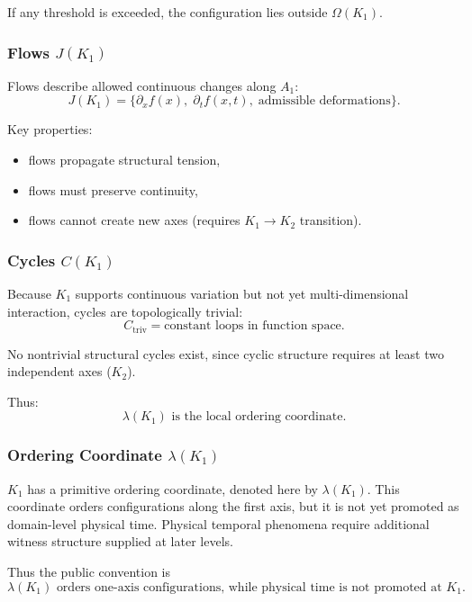 If any threshold is exceeded, the configuration lies outside
$\Omega(K_1)$.

\subsubsection{Flows \texorpdfstring{$J(K_1)$}{J(K_1)}}

Flows describe allowed continuous changes along $A_1$:
\[
J(K_1) = \{ \partial_x f(x),\; \partial_t f(x,t),\; \text{admissible deformations} \}.
\]

Key properties:
\begin{itemize}
    \item flows propagate structural tension,
    \item flows must preserve continuity,
    \item flows cannot create new axes (requires $K_1\to K_2$ transition).
\end{itemize}

\subsubsection{Cycles \texorpdfstring{$C(K_1)$}{C(K_1)}}

Because $K_1$ supports continuous variation but not yet multi-dimensional
interaction, cycles are topologically trivial:
\[
C_{\mathrm{triv}} = \text{constant loops in function space}.
\]

No nontrivial structural cycles exist, since cyclic structure requires
at least two independent axes ($K_2$).

Thus:
\[
\lambda(K_1) \text{ is the local ordering coordinate.}
\]

\subsubsection{Ordering Coordinate \texorpdfstring{$\lambda(K_1)$}{lambda(K_1)}}

\(K_1\) has a primitive ordering coordinate, denoted here by
\(\lambda(K_1)\). This coordinate orders configurations along the first axis,
but it is not yet promoted as domain-level physical time. Physical temporal
phenomena require additional witness structure supplied at later levels.

Thus the public convention is
\[
\lambda(K_1) \text{ orders one-axis configurations, while physical time is not promoted at } K_1.
\]

